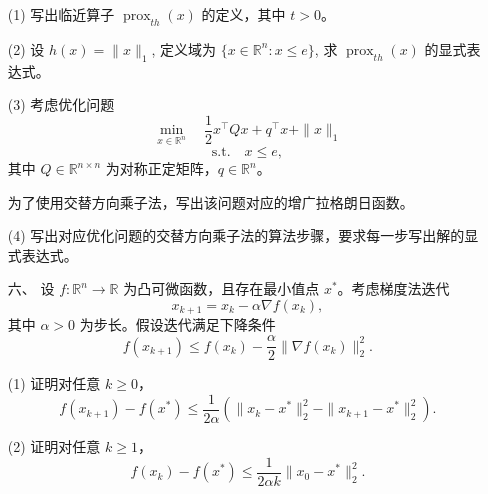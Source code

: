 \begin{itemize}
(1) 写出临近算子 $\operatorname{prox}_{t h}(x)$ 的定义，其中 $t>0$。

(2) 设 $h(x)=\|x\|_1$, 定义域为 $\{x\in\mathbb{R}^n:x\leq e\}$,
求 $\operatorname{prox}_{t h}(x)$ 的显式表达式。

(3) 考虑优化问题
\[
    \min_{x\in\mathbb{R}^n}
    \quad
    \frac{1}{2}x^\top Qx+q^\top x+\|x\|_1
\]
\[
    \text{s.t.}\quad x\leq e,
\]
其中 $Q\in\mathbb{R}^{n\times n}$ 为对称正定矩阵，$q\in\mathbb{R}^n$。

为了使用交替方向乘子法，写出该问题对应的增广拉格朗日函数。

(4) 写出对应优化问题的交替方向乘子法的算法步骤，要求每一步写出解的显式表达式。

\item[六、] 
设 $f:\mathbb{R}^n\to\mathbb{R}$ 为凸可微函数，且存在最小值点 $x^*$。考虑梯度法迭代
\[
    x_{k+1}=x_k-\alpha \nabla f(x_k),
\]
其中 $\alpha>0$ 为步长。假设迭代满足下降条件
\[
    f(x_{k+1})
    \leq
    f(x_k)-\frac{\alpha}{2}\|\nabla f(x_k)\|_2^2.
\]

(1) 证明对任意 $k\geq 0$，
\[
    f(x_{k+1})-f(x^*)
    \leq
    \frac{1}{2\alpha}
    \left(
        \|x_k-x^*\|_2^2-\|x_{k+1}-x^*\|_2^2
    \right).
\]

(2) 证明对任意 $k\geq 1$，
\[
    f(x_k)-f(x^*)
    \leq
    \frac{1}{2\alpha k}\|x_0-x^*\|_2^2.
\]

\end{itemize}